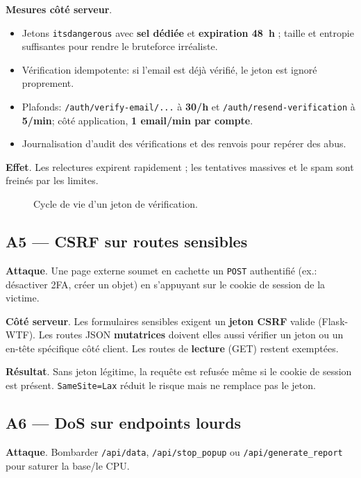 \textbf{Mesures côté serveur}.
\begin{itemize}
  \item Jetons \texttt{itsdangerous} avec \textbf{sel dédiée} et \textbf{expiration 48~h} ; taille et entropie suffisantes pour rendre le bruteforce irréaliste.
  \item Vérification idempotente: si l'email est déjà vérifié, le jeton est ignoré proprement.
  \item Plafonds: \texttt{/auth/verify-email/...} à \textbf{30/h} et \texttt{/auth/resend-verification} à \textbf{5/min}; côté application, \textbf{1 email/min par compte}.
  \item Journalisation d'audit des vérifications et des renvois pour repérer des abus.
\end{itemize}

\textbf{Effet}. Les relectures expirent rapidement ; les tentatives massives et le spam sont freinés par les limites.

\begin{figure}[h]
  \centering
  \caption{Cycle de vie d'un jeton de vérification.}
\end{figure}

\subsection*{A5 — CSRF sur routes sensibles}
\textbf{Attaque}. Une page externe soumet en cachette un \texttt{POST} authentifié (ex.: désactiver 2FA, créer un objet) en s'appuyant sur le cookie de session de la victime.

\textbf{Côté serveur}. Les formulaires sensibles exigent un \textbf{jeton CSRF} valide (Flask-WTF). Les routes JSON \textbf{mutatrices} doivent elles aussi vérifier un jeton ou un en-tête spécifique côté client. Les routes de \textbf{lecture} (GET) restent exemptées.

\textbf{Résultat}. Sans jeton légitime, la requête est refusée même si le cookie de session est présent. \texttt{SameSite=Lax} réduit le risque mais ne remplace pas le jeton.

\subsection*{A6 — DoS sur endpoints lourds}
\textbf{Attaque}. Bombarder \texttt{/api/data}, \texttt{/api/stop\_popup} ou \texttt{/api/generate\_report} pour saturer la base/le CPU.

